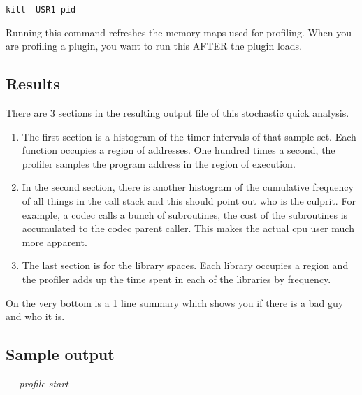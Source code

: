 \hspace{2em}\texttt{kill -USR1 pid}

Running this command refreshes the memory maps used for profiling. When you are profiling a plugin, you want to run this AFTER the plugin loads.

\subsection{Results}
\label{sub:results}

There are 3 sections in the resulting output file of this stochastic quick analysis.

\begin{enumerate}[nosep]
	\item The first section is a histogram of the timer intervals of that sample set. Each function occupies a region of addresses. One hundred times a second, the profiler samples the program address in the region of execution.
	\item In the second section, there is another histogram of the cumulative frequency of all things in the call stack and this should point out who is the culprit. For example, a codec calls a bunch of subroutines, the cost of the subroutines is accumulated to the codec parent caller. This makes the actual cpu user much more apparent.
	\item The last section is for the library spaces. Each library occupies a region and the profiler adds up the time spent in each of the libraries by frequency.
\end{enumerate}

On the very bottom is a 1 line summary which shows you if there is a bad guy and who it is.

\subsection{Sample output}
\label{sub:sample_output}

\textit{--- profile start ---}

